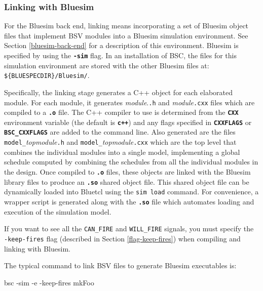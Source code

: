 \documentclass{article}
\newcommand{\te}[1]{\texttt{#1}}
\newenvironment{centerboxverbatim}
  {\center
   \boxedverbatim}
  {\endboxedverbatim
  {\endcenter }}
\begin{document}


\subsubsection{Linking with Bluesim}

For the Bluesim back end, linking means incorporating a set of Bluesim object
files that implement BSV modules into a Bluesim simulation
environment.  See Section \ref{bluesim-back-end} for a description of this
environment.  Bluesim is specified by using the {\bf\tt -sim} flag.
In an installation of BSC, the files for
this simulation environment are stored with the other Bluesim files
at: \verb|${BLUESPECDIR}/Bluesim/|.

Specifically, the linking stage generates a C++ object for each
elaborated module.  For each module, it generates {\em module}.\te{.h} and
{\em module}\te{.cxx} files which are compiled to a {\bf\tt .o} file.
The C++ compiler to use is determined from the {\bf\tt CXX}
environment variable (the default is {\bf\tt c++}) and any flags
specified in {\bf\tt CXXFLAGS} or {\bf\tt BSC\_CXXFLAGS} are added to
the command line.
Also generated are the files \te{model\_}{\em topmodule}\te{.h} and
\te{model\_}{\em topmodule}\te{.cxx} which are the top level that combines
the individual modules into a single model,
implementing a global schedule computed by combining the schedules from
all the individual modules in the design.
Once compiled to {\bf\tt .o} files, these objects are linked with
the Bluesim library files to produce an {\bf\tt .so} shared object
file.  This shared object file can be dynamically loaded into Bluetcl
using the {\tt sim load} command.  For convenience, a wrapper script
is generated along with the {\bf\tt .so} file which automates loading
and execution of the simulation model.

If you want to see all the \te{CAN\_FIRE} and \te{WILL\_FIRE} signals,
you must specify the \te{-keep-fires} flag (described in Section
\ref{flag-keep-fires})  when compiling and linking
with Bluesim.

The typical command to link  BSV files to generate    Bluesim
executables is:

\begin{centerboxverbatim}
bsc -sim -e -keep-fires mkFoo
\end{centerboxverbatim}
\end{document}
